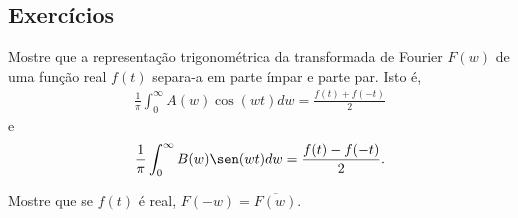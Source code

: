 \subsection*{Exercícios}
\begin{exer}Mostre que a representação trigonométrica da transformada de Fourier $F(w)$ de uma função real $f(t)$ separa-a em parte ímpar e parte par. Isto é,
\begin{eqnarray*}
\frac{1}{\pi}\int_{0}^\infty A(w)\cos(wt)dw=\frac{f(t)+f(-t)}{2}
\end{eqnarray*}
e
\begin{eqnarray*}
\frac{1}{\pi}\int_{0}^\infty B(w)\sen(wt)dw=\frac{f(t)-f(-t)}{2}.
\end{eqnarray*}
\end{exer}
\begin{exer}Mostre que se $f(t)$ é real, $F(-w)=\overline{F(w)}$.
\end{exer}
